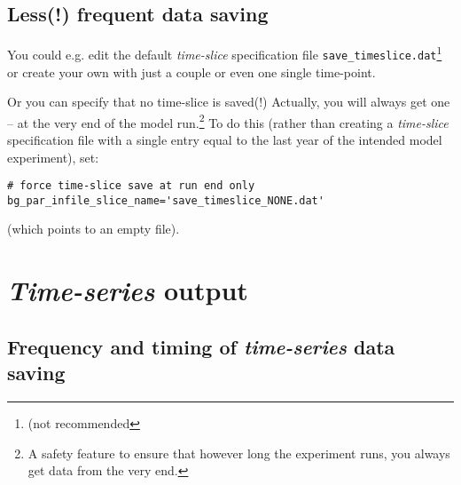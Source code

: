 \documentclass[11pt,fleqn]{book} %
\begin{document}
%
\subsection{Less(!) frequent data saving}

You could e.g. edit the default \textit{time-slice} specification file \texttt{save\_timeslice.dat}\footnote{(not recommended} or create your own with just a couple or even one single time-point.

Or you can specify that no time-slice is saved(!) Actually, you will always get one -- at the very end of the model run.\footnote{A safety feature to ensure that however long the experiment runs, you always get data from the very end.} To do this (rather than creating a \textit{time-slice} specification file with a single entry equal to the last year of the intended model experiment), set:

\vspace{-1mm}\begin{verbatim}
# force time-slice save at run end only
bg_par_infile_slice_name='save_timeslice_NONE.dat'
\end{verbatim}\vspace{-1mm}

\noindent(which points to an empty file).


\newpage


\section{\textit{Time-series} output}


\subsection{Frequency and timing of \textit{time-series} data saving}
\end{document}

